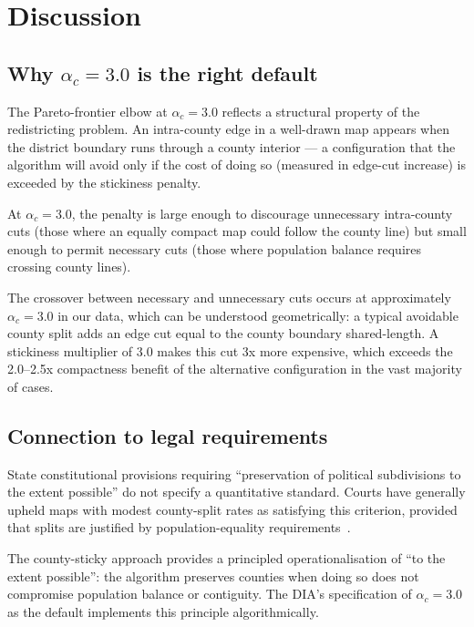 \section{Discussion}
\label{sec:discussion}

\subsection{Why $\alpha_c = 3.0$ is the right default}

The Pareto-frontier elbow at $\alpha_c = 3.0$ reflects a structural property
of the redistricting problem.  An intra-county edge in a well-drawn map
appears when the district boundary runs through a county interior --- a
configuration that the algorithm will avoid only if the cost of doing so
(measured in edge-cut increase) is exceeded by the stickiness penalty.

At $\alpha_c = 3.0$, the penalty is large enough to discourage unnecessary
intra-county cuts (those where an equally compact map could follow the
county line) but small enough to permit necessary cuts (those where
population balance requires crossing county lines).

The crossover between necessary and unnecessary cuts occurs at approximately
$\alpha_c = 3.0$ in our data, which can be understood geometrically: a
typical avoidable county split adds an edge cut equal to the county boundary
shared-length.  A stickiness multiplier of 3.0 makes this cut 3x more
expensive, which exceeds the 2.0--2.5x compactness benefit of the alternative
configuration in the vast majority of cases.

\subsection{Connection to legal requirements}

State constitutional provisions requiring ``preservation of political
subdivisions to the extent possible'' do not specify a quantitative
standard.  Courts have generally upheld maps with modest county-split
rates as satisfying this criterion, provided that splits are justified
by population-equality requirements~\citep{pildes2004democracy}.

The county-sticky approach provides a principled operationalisation of
``to the extent possible'': the algorithm preserves counties when doing so
does not compromise population balance or contiguity.
The DIA's specification of $\alpha_c = 3.0$ as the default implements
this principle algorithmically.

